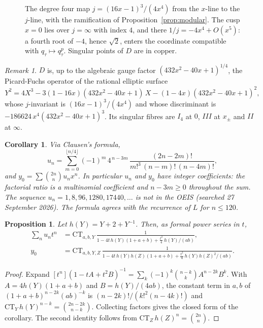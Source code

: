 \documentclass[11pt]{amsart}
\newtheorem{proposition}[theorem]{Proposition}
\newtheorem{corollary}[theorem]{Corollary}
\theoremstyle{definition}
\theoremstyle{remark}
\newtheorem{remark}[theorem]{Remark}
\begin{document}
\begin{figure}[ht]
\centering

\caption{The degree four map $j=(16x-1)^3/(4x^4)$ from the $x$-line to the $j$-line, with the
ramification of Proposition~\ref{prop:modular}. The cusp $x=0$ lies over $j=\infty$ with index
$4$, and there $1/j=-4x^4+O(x^5)$: a fourth root of $-4$, hence $\sqrt2$, enters the coordinate
compatible with $q_\tau\mapsto q_\tau^p$. Singular points of $D$ are in copper.}
\label{fig:cover}
\end{figure}

\begin{remark}
$D$ is, up to the algebraic gauge factor $(432x^2-40x+1)^{1/4}$, the Picard-Fuchs operator of the
rational elliptic surface
\[
Y^2=4X^3-3(1-16x)(432x^2-40x+1)\,X-(1-4x)(432x^2-40x+1)^2,
\]
whose $j$-invariant is $(16x-1)^3/(4x^4)$ and whose discriminant is
$-186624\,x^4(432x^2-40x+1)^3$. Its singular fibres are $I_4$ at $0$, $III$ at $x_\pm$ and $II$ at
$\infty$.
\end{remark}

\begin{corollary}
Via Clausen's formula,
\[
u_n=\sum_{m=0}^{\lfloor n/4\rfloor}(-1)^m\,4^{\,n-3m}\,\frac{(2n-2m)!}{m!^3\,(n-m)!\,(n-4m)!},
\]
and $y_0=\sum\binom{2n}{n}u_nx^n$. In particular $u_n$ and $y_0$ have integer coefficients: the factorial ratio is a multinomial coefficient and $n-3m\ge0$ throughout the sum. The sequence $u_n=1,8,96,1280,17440,\dots$ is not in the OEIS
(searched 27 September 2026). The formula agrees with the recurrence of $L$ for $n\le 120$.
\end{corollary}

\begin{proposition}\label{prop:ct}
Let $h(Y)=Y+2+Y^{-1}$. Then, as formal power series in $t$,
\begin{align*}
\sum_n u_nt^n&=\mathrm{CT}_{a,b,Y}\,\frac{1}{1-4t\,h(Y)(1+a+b)+\tfrac{t^2}{4}\,h(Y)/(ab)},\\
y_0&=\mathrm{CT}_{a,b,Y,Z}\,\frac{1}{1-4t\,h(Y)h(Z)(1+a+b)+\tfrac{t^2}{4}\,h(Y)h(Z)^2/(ab)} .
\end{align*}
\end{proposition}

\begin{proof}
Expand $[t^n](1-tA+t^2B)^{-1}=\sum_k(-1)^k\binom{n-k}{k}A^{n-2k}B^k$. With $A=4h(Y)(1+a+b)$ and
$B=h(Y)/(4ab)$, the constant term in $a,b$ of $(1+a+b)^{n-2k}(ab)^{-k}$ is
$(n-2k)!/(k!^2(n-4k)!)$ and $\mathrm{CT}_Y\,h(Y)^{n-k}=\binom{2n-2k}{n-k}$. Collecting factors gives
the closed form of the corollary. The second identity follows from $\mathrm{CT}_Z\,h(Z)^n=\binom{2n}{n}$.
\end{proof}
\end{document}
